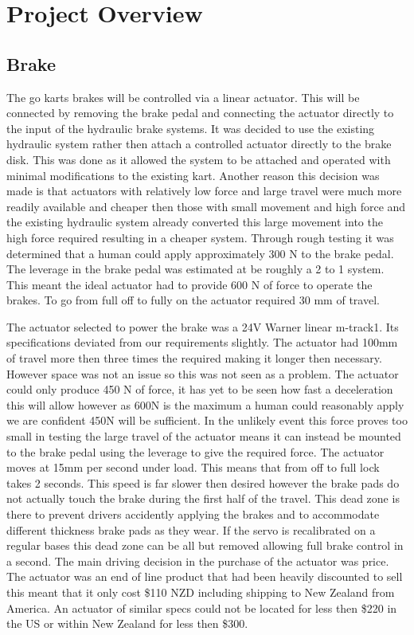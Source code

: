 \chapter{Project Overview}

\section*{Brake}
The go karts brakes will be controlled via a linear actuator. This will be connected by removing the brake pedal and connecting the actuator directly to the input of the hydraulic brake systems. It was decided to use the existing hydraulic system rather then attach a controlled actuator directly to the brake disk. This was done as it allowed the system to be attached and operated with minimal modifications to the existing kart. Another reason this decision was made is that actuators with relatively low force and large travel were much more readily available and cheaper then those with small movement and high force and the existing hydraulic system already converted this large movement into the high force required resulting in a cheaper system. Through rough testing it was determined that a human could apply approximately 300 N to the brake pedal. The leverage in the brake pedal was estimated at be roughly a 2 to 1 system. This meant the ideal actuator had to provide 600 N of force to operate the brakes. To go from full off to fully on the actuator required 30 mm of travel.

The actuator selected to power the brake was a 24V Warner linear m-track1. Its specifications deviated from our requirements slightly. The actuator had 100mm of travel more then three times the required making it longer then necessary. However space was not an issue so this was not seen as a problem. The actuator could only produce 450 N of force, it has yet to be seen how fast a deceleration this will allow however as 600N is the maximum a human could reasonably apply we are confident 450N will be sufficient. In the unlikely event this force proves too small in testing the large travel of the actuator means it can instead be mounted to the brake pedal using the leverage to give the required force. The actuator moves at 15mm per second under load. This means that from off to full lock takes 2 seconds. This speed is far slower then desired however the brake pads do not actually touch the brake during the first half of the travel. This dead zone is there to prevent drivers accidently applying the brakes and to accommodate different thickness brake pads as they wear. If the servo is recalibrated on a regular bases this dead zone can be all but removed allowing full brake control in a second. The main driving decision in the purchase of the actuator was price. The actuator was an end of line product that had been heavily discounted to sell this meant that it only cost \$110 NZD including shipping to New Zealand from America. An actuator of similar specs could not be located for less then \$220 in the US or within New Zealand for less then \$300.
